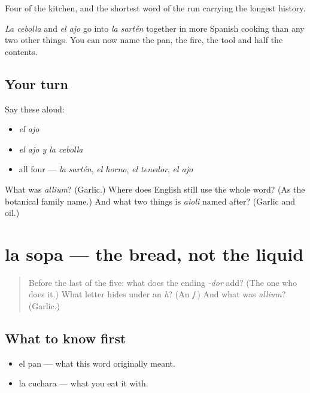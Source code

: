 \begin{grammarlens}[title={What you've built}]
Four of the kitchen, and the shortest word of the run carrying the longest history.

\emph{La cebolla} and \emph{el ajo} go into \emph{la sartén} together in more Spanish cooking than any two other things. You can now name the pan, the fire, the tool and half the contents.
\end{grammarlens}

\subsection*{Your turn}
Say these aloud:

\begin{itemize}
\raggedright
  \item \emph{el ajo}
  \item \emph{el ajo y la cebolla}
  \item all four — \emph{la sartén}, \emph{el horno}, \emph{el tenedor}, \emph{el ajo}
\end{itemize}

\begin{tcolorbox}[breakable,colback=teal!4,colframe=teal!35!black,title={Before you move on}]
What was \emph{allium}? (Garlic.) Where does English still use the whole word? (As the botanical family name.) And what two things is \emph{aioli} named after? (Garlic and oil.)
\end{tcolorbox}
\section[la sopa]{la sopa — the bread, not the liquid}

\label{lesson:ES-C297-sopa}



\begin{quote}
Before the last of the five: what does the ending \emph{-dor} add? (The one who does it.) What letter hides under an \emph{h}? (An \emph{f}.) And what was \emph{allium}? (Garlic.)
\end{quote}

\subsection*{What to know first}
\begin{itemize}
\raggedright
  \item el pan — what this word originally meant.
  \item la cuchara — what you eat it with.
\end{itemize}

